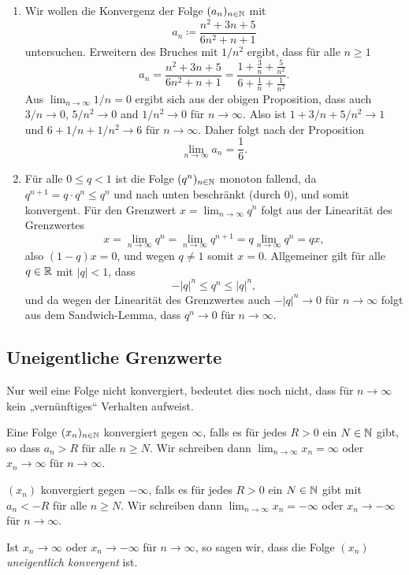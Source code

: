 \documentclass[a4paper,10pt]{article}
\begin{document}
\begin{bsp}
 \begin{enumerate}
  \item
   Wir wollen die Konvergenz der Folge $(a_n)_{n \in \mathbb{N}}$ mit
   \[
    a_n \coloneqq \frac{n^2 + 3n + 5}{6n^2 + n + 1}
   \]
   untersuchen. Erweitern des Bruches mit $1/n^2$ ergibt, dass für alle $n \geq 1$
   \[
    a_n
    = \frac{n^2 + 3n + 5}{6n^2 + n + 1}
    = \frac{1 + \frac{3}{n} + \frac{5}{n^2}}{6 + \frac{1}{n} + \frac{1}{n^2}}.
   \]
   Aus $\lim_{n \to \infty} 1/n = 0$ ergibt sich aus der obigen Proposition, dass auch $3/n \to 0$, $5/n^2 \to 0$ and $1/n^2 \to 0$ für $n \to \infty$. Also ist $1 + 3/n + 5/n^2 \to 1$ und $6 + 1/n + 1/n^2 \to 6$ für $n \to \infty$. Daher folgt nach der Proposition
   \[
    \lim_{n \to \infty} a_n = \frac{1}{6}.
   \]
  \item
   Für alle $0 \leq q < 1$ ist die Folge $(q^n)_{n \in \mathbb{N}}$ monoton fallend, da $q^{n+1} = q \cdot q^n \leq q^n$ und nach unten beschränkt (durch $0$), und somit konvergent. Für den Grenzwert $x = \lim_{n \to \infty} q^n$ folgt aus der Linearität des Grenzwertes
   \[
    x = \lim_{n \to \infty} q^n = \lim_{n \to \infty} q^{n+1} = q \lim_{n \to \infty} q^n = q x,
   \]
   also $(1-q)x = 0$, und wegen $q \neq 1$ somit $x = 0$. Allgemeiner gilt für alle $q \in \mathbb{R}$ mit $|q| < 1$, dass
   \[
    -|q|^n \leq q^n \leq |q|^n,
   \]
   und da wegen der Linearität des Grenzwertes auch $-|q|^n \to 0$ für $n \to \infty$ folgt aus dem Sandwich-Lemma, dass $q^n \to 0$ für $n \to \infty$.
 \end{enumerate}
\end{bsp}



\subsection{Uneigentliche Grenzwerte}
Nur weil eine Folge nicht konvergiert, bedeutet dies noch nicht, dass für $n \to \infty$ kein „vernünftiges“ Verhalten aufweist.


\begin{defi}
 Eine Folge $(x_n)_{n \in \mathbb{N}}$ konvergiert gegen $\infty$, falls es für jedes $R > 0$ ein $N \in \mathbb{N}$ gibt, so dass $a_n > R$ für alle $n \geq N$. Wir schreiben dann $\lim_{n \to \infty} x_n = \infty$ oder $x_n \to \infty$ für $n \to \infty$.
 
 $(x_n)$ konvergiert gegen $-\infty$, falls es für jedes $R > 0$ ein $N \in \mathbb{N}$ gibt mit $a_n < -R$ für alle $n \geq N$. Wir schreiben dann $\lim_{n \to \infty} x_n = -\infty$ oder $x_n \to -\infty$ für $n \to \infty$.
 
 Ist $x_n \to \infty$ oder $x_n \to -\infty$ für $n \to \infty$, so sagen wir, dass die Folge $(x_n)$ \emph{uneigentlich konvergent} ist.
\end{defi}
\end{document}
